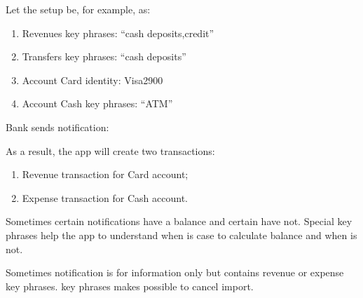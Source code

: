 \documentclass[a4paper,10pt,english]{sphinxmanual}
\begin{document}
\sphinxAtStartPar
Let the setup be, for example, as:
\begin{enumerate}
%
\item {} 
\sphinxAtStartPar
Revenues key phrases: “cash deposits,credit”

\item {} 
\sphinxAtStartPar
Transfers key phrases: “cash deposits”

\item {} 
\sphinxAtStartPar
Account Card identity: Visa2900

\item {} 
\sphinxAtStartPar
Account Cash key phrases: “ATM”

\end{enumerate}

\sphinxAtStartPar
Bank sends notification:

\begin{sphinxVerbatim}[commandchars=\\\{\}]
          
\end{sphinxVerbatim}

\sphinxAtStartPar
As a result, the app will create two transactions:
\begin{enumerate}
%
\item {} 
\sphinxAtStartPar
Revenue transaction for Card account;

\item {} 
\sphinxAtStartPar
Expense transaction for Cash account.

\end{enumerate}

\noindent{}
\noindent{}

\sphinxAtStartPar
Sometimes certain notifications have a balance and certain have not. Special
key phrases help the app to understand when is case to calculate balance and when is not.

\sphinxAtStartPar
Sometimes notification is for information only but contains revenue or expense key phrases.
 key phrases makes possible to cancel import.
\end{document}
